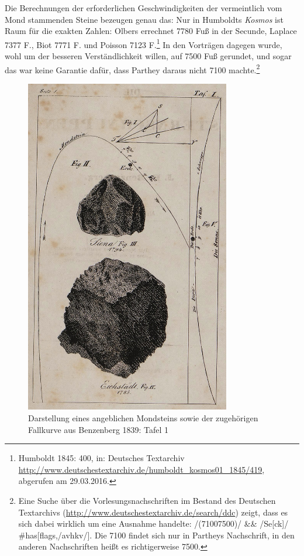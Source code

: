 \documentclass[output=paper]{langsci/langscibook}
\begin{document}
Die Berechnungen der erforderlichen Geschwindigkeiten der vermeintlich \linebreak
vom Mond stammenden Steine bezeugen genau das: Nur in Humboldts
\emph{Kosmos} ist Raum für die exakten Zahlen: Olbers errechnet 7780 Fuß
in der Secunde, Laplace 7377 F., Biot 7771 F. und Poisson 7123
F.\footnote{Humboldt 1845: 400, in: Deutsches Textarchiv
  \url{http://www.deutschestextarchiv.de/humboldt_kosmos01_1845/419},
  abgerufen am 29.03.2016.} In den Vorträgen dagegen wurde, wohl um der
besseren Verständlichkeit willen, auf 7500 Fuß gerundet, und sogar das
war keine Garantie dafür, dass Parthey daraus nicht 7100
machte.\footnote{Eine Suche über die Vorlesungsnachschriften im Bestand
  des Deutschen Textarchivs
  (\url{http://www.deutschestextarchiv.de/search/ddc}) zeigt, dass es
  sich dabei wirklich um eine Ausnahme handelte: /(7100\textbar{}7500)/
  \&\& /Se{[}ck{]}/ \#has{[}flags,/avhkv/{]}. Die 7100 findet sich nur
  in Partheys Nachschrift, in den anderen Nachschriften heißt es
  richtigerweise 7500.}

\begin{figure}[htbp]
\centering
\includegraphics[width=0.8\textwidth]{figures/hug02.jpg}
\caption{Darstellung eines angeblichen Mondsteins sowie der zugehörigen
Fallkurve aus Benzenberg 1839: Tafel 1}
\end{figure}
\end{document}
